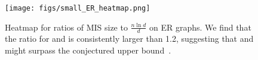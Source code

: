 \begin{figure}[t]
    \centering
    \texttt{[image: figs/small\_ER\_heatmap.png]}
    \caption{Heatmap for ratios of MIS size to $\frac{n\ln d}{d}$ on ER graphs. We find that the ratio for \redumis and \kamis is consistently larger than 1.2, suggesting that \redumis and \kamis might surpass the conjectured upper bound~\citep{coja2015independent}.}
    \label{fig:er_heatmap_small}
\end{figure}